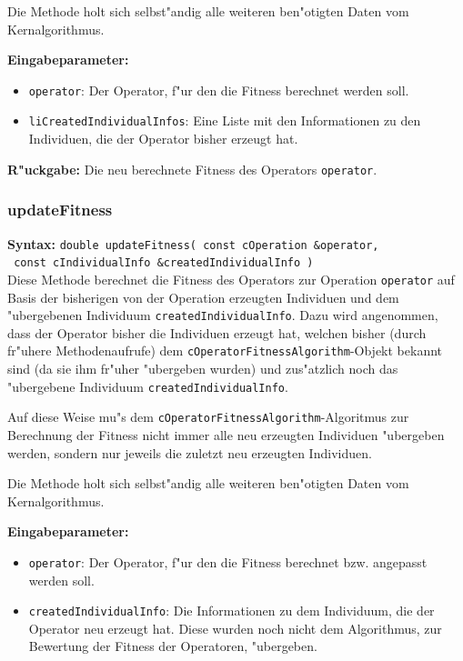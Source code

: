 Die Methode holt sich selbst"andig alle weiteren ben"otigten Daten vom Kernalgorithmus.

\bigskip\noindent
\textbf{Eingabeparameter:}
\begin{itemize}
 \item \verb|operator|: Der Operator, f"ur den die Fitness berechnet werden soll.
 \item \verb|liCreatedIndividualInfos|: Eine Liste mit den Informationen zu den Individuen, die der Operator bisher erzeugt hat.
\end{itemize}

\bigskip\noindent
\textbf{R"uckgabe:} Die neu berechnete Fitness des Operators \verb|operator|.


\subsubsection{updateFitness}

\textbf{Syntax:} \verb|double updateFitness( const cOperation &operator,| \\\verb| const cIndividualInfo &createdIndividualInfo )| \\

Diese Methode berechnet die Fitness des Operators zur Operation \verb|operator| auf Basis der bisherigen von der Operation erzeugten Individuen und dem "ubergebenen Individuum \verb|createdIndividualInfo|. Dazu wird angenommen, dass der Operator bisher die Individuen erzeugt hat, welchen bisher (durch fr"uhere Methodenaufrufe) dem \verb|cOperatorFitnessAlgorithm|-Objekt bekannt sind (da sie ihm fr"uher "ubergeben wurden) und zus"atzlich noch das "ubergebene Individuum \verb|createdIndividualInfo|.

Auf diese Weise mu"s dem \verb|cOperatorFitnessAlgorithm|-Algoritmus zur Berechnung der Fitness nicht immer alle neu erzeugten Individuen "ubergeben werden, sondern nur jeweils die zuletzt neu erzeugten Individuen.

Die Methode holt sich selbst"andig alle weiteren ben"otigten Daten vom Kernalgorithmus.

\bigskip\noindent
\textbf{Eingabeparameter:}
\begin{itemize}
 \item \verb|operator|: Der Operator, f"ur den die Fitness berechnet bzw. angepasst werden soll.
 \item \verb|createdIndividualInfo|: Die Informationen zu dem Individuum, die der Operator neu erzeugt hat. Diese wurden noch nicht dem Algorithmus, zur Bewertung der Fitness der Operatoren, "ubergeben.
\end{itemize}

